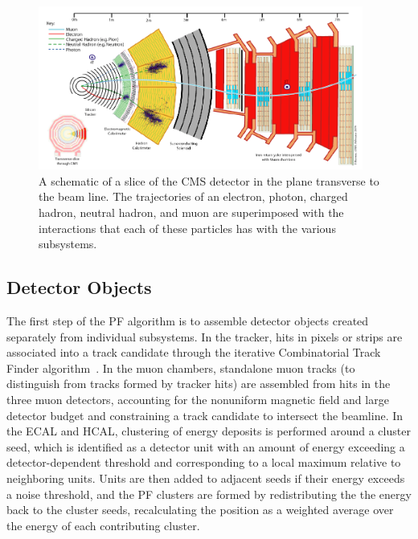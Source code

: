 \begin{figure}[ht]
 \begin{center}
    \includegraphics[width=0.95\textwidth]{figures/objects/pf.pdf}
      \end{center}
\caption{A schematic of a slice of the CMS detector in the plane transverse to the beam line.
The trajectories of an electron, photon, charged hadron, neutral hadron, and muon are superimposed
with the interactions that each of these particles has with the various subsystems.}
\label{fig:PF}
\end{figure}

\subsection{Detector Objects\label{subsec:detobj}}

The first step of the PF algorithm is to assemble detector objects created separately from
individual subsystems. In the tracker, hits in pixels or strips are associated into a track candidate
through the iterative Combinatorial Track Finder algorithm~\cite{PFPAS2009}. In the muon chambers,
standalone muon tracks (to distinguish from tracks formed by tracker hits)
are assembled from hits in the three muon detectors, accounting
for the nonuniform magnetic field and large detector budget and constraining a track candidate to
intersect the beamline. In the ECAL and HCAL, clustering of energy deposits is performed around a
cluster seed, which is identified as a detector unit with an amount of energy exceeding a
detector-dependent threshold and corresponding to a local maximum relative to neighboring units.
Units are then added to adjacent seeds if their energy exceeds a noise threshold,
and the PF clusters are
formed by redistributing the the energy back to the cluster seeds, recalculating the position as a
weighted average over the energy of each contributing cluster.

